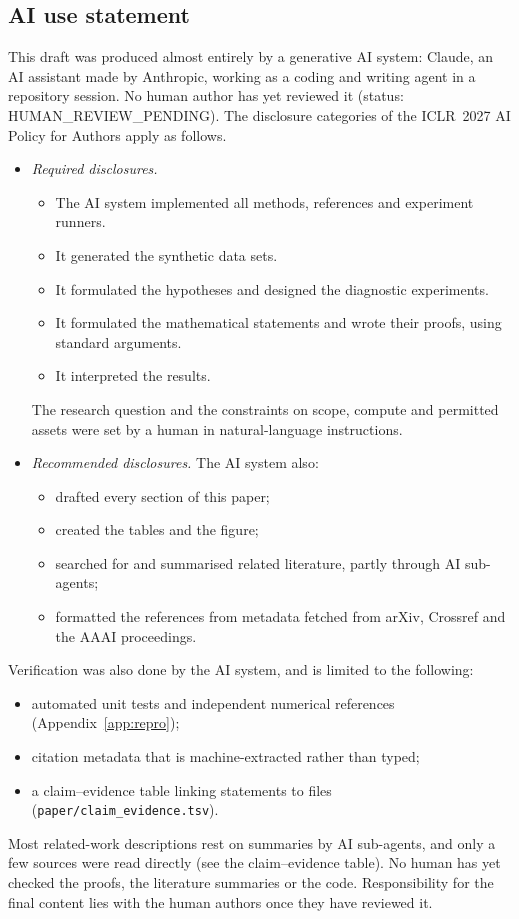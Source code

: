 \subsection*{AI use statement}

This draft was produced almost entirely by a generative AI system: Claude, an AI assistant made
by Anthropic, working as a coding and writing agent in a repository session. No human author has
yet reviewed it (status: HUMAN\_REVIEW\_PENDING). The disclosure categories of the ICLR~2027 AI
Policy for Authors apply as follows.

\begin{itemize}
\item \emph{Required disclosures.}
\begin{itemize}
\item The AI system implemented all methods, references and experiment runners.
\item It generated the synthetic data sets.
\item It formulated the hypotheses and designed the diagnostic experiments.
\item It formulated the mathematical statements and wrote their proofs, using standard arguments.
\item It interpreted the results.
\end{itemize}
The research question and the constraints on scope, compute and permitted assets were set by a
human in natural-language instructions.
\item \emph{Recommended disclosures.} The AI system also:
\begin{itemize}
\item drafted every section of this paper;
\item created the tables and the figure;
\item searched for and summarised related literature, partly through AI sub-agents;
\item formatted the references from metadata fetched from arXiv, Crossref and the AAAI
proceedings.
\end{itemize}
\end{itemize}

Verification was also done by the AI system, and is limited to the following:
\begin{itemize}
\item automated unit tests and independent numerical references (Appendix~\ref{app:repro});
\item citation metadata that is machine-extracted rather than typed;
\item a claim--evidence table linking statements to files (\texttt{paper/claim\_evidence.tsv}).
\end{itemize}
Most related-work descriptions rest on summaries by AI sub-agents, and only a few sources were
read directly (see the claim--evidence table). No human has yet checked the proofs, the literature
summaries or the code. Responsibility for the final content lies with the human authors once they
have reviewed it.

